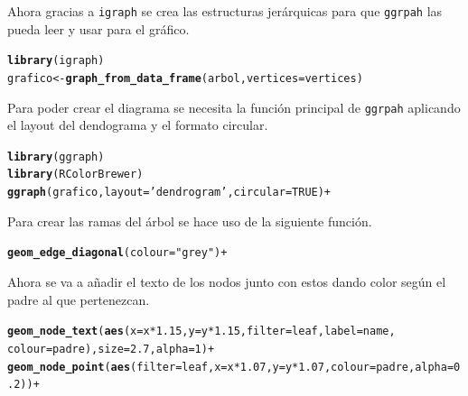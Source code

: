 \documentclass{article}\usepackage[]{graphicx}\usepackage[]{color}
\makeatletter
\newcommand{\hlstr}[1]{\textcolor[rgb]{0.192,0.494,0.8}{#1}}%
\newcommand{\hlstd}[1]{\textcolor[rgb]{0.345,0.345,0.345}{#1}}%
\newcommand{\hlkwb}[1]{\textcolor[rgb]{0.69,0.353,0.396}{#1}}%
\newcommand{\hlkwc}[1]{\textcolor[rgb]{0.333,0.667,0.333}{#1}}%
\newcommand{\hlkwd}[1]{\textcolor[rgb]{0.737,0.353,0.396}{\textbf{#1}}}%
\newenvironment{kframe}{%
 \def\at@end@of@kframe{}%
 \ifinner\ifhmode%
  \def\at@end@of@kframe{\end{minipage}}%
  \begin{minipage}{\columnwidth}%
 \fi\fi%
 \def\FrameCommand##1{\hskip\@totalleftmargin \hskip-\fboxsep
 \colorbox{shadecolor}{##1}\hskip-\fboxsep
     \hskip-\linewidth \hskip-\@totalleftmargin \hskip\columnwidth}%
 \MakeFramed {\advance\hsize-\width
   \@totalleftmargin\z@ \linewidth\hsize
   \@setminipage}}%
 {\par\unskip\endMakeFramed%
 \at@end@of@kframe}
\newenvironment{knitrout}{}{} %
\makeatother
\begin{document}
Ahora gracias a \texttt{igraph} se crea las estructuras jer\'arquicas para que \texttt{ggrpah} las pueda leer y usar para el gr\'afico.
\begin{knitrout}
\color{fgcolor}\begin{kframe}
\begin{alltt}
\hlkwd{library}\hlstd{(igraph)}
\hlstd{grafico} \hlkwb{<-} \hlkwd{graph_from_data_frame}\hlstd{(arbol,} \hlkwc{vertices} \hlstd{= vertices)}
\end{alltt}
\end{kframe}
\end{knitrout}
Para poder crear el diagrama se necesita la funci\'on principal de \texttt{ggrpah} aplicando el layout del dendograma y el formato circular.

\begin{knitrout}
\color{fgcolor}\begin{kframe}
\begin{alltt}
\hlkwd{library}(ggraph)
\hlkwd{library}(RColorBrewer)
\hlkwd{ggraph}( grafico, layout = \hlstr{'dendrogram'}, circular = TRUE) +
\end{alltt}
\end{kframe}
\end{knitrout}
Para crear las ramas del \'arbol se hace uso de la siguiente funci\'on.
\begin{knitrout}
\color{fgcolor}\begin{kframe}
\begin{alltt}
    \hlkwd{geom_edge_diagonal}(colour=\hlstr{"grey"}) +
\end{alltt}
\end{kframe}
\end{knitrout}
Ahora se va a a\~nadir el texto de los nodos junto con estos dando color seg\'un el padre al que pertenezcan.
\begin{knitrout}
\color{fgcolor}\begin{kframe}
\begin{alltt}
    \hlkwd{geom_node_text}(\hlkwd{aes}(x = x*1.15, y=y*1.15, filter = leaf, label=name, 
                       colour=padre), size=2.7, alpha=1) +
    \hlkwd{geom_node_point}(\hlkwd{aes}(filter = leaf, x = x*1.07, y=y*1.07, colour=padre, alpha=0.2)) +
\end{alltt}
\end{kframe}
\end{knitrout}
\end{document}

